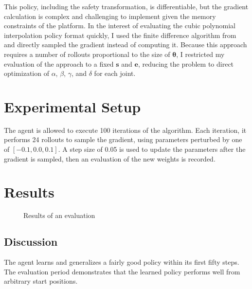 \documentclass{article}
\newcommand{\thetab}{\bm{\theta}}
\begin{document}
This policy, including the safety transformation, is differentiable, but the gradient calculation is complex and challenging to implement given the memory constraints of the platform. In the interest of evaluating the cubic polynomial interpolation policy format quickly, I used the finite difference algorithm from \cite{stone2006} and directly sampled the gradient instead of computing it. Because this approach requires a number of rollouts proportional to the size of $\thetab$,  I restricted my evaluation of the approach to a fixed $\bm{s}$ and $\bm{e}$, reducing the problem to direct optimization of $\alpha$, $\beta$, $\gamma$, and $\delta$ for each joint.
	


\section{Experimental Setup}

The agent is allowed to execute 100 iterations of the algorithm. Each iteration, it performs 24 rollouts to sample the gradient, using parameters perturbed by one of $[-0.1, 0.0, 0.1]$. A step size of 0.05 is used to update the parameters after the gradient is sampled, then an evaluation of the new weights is recorded.



\section{Results}


	\begin{figure}[h]
		\begin{center}
			\caption{Results of an evaluation}
		\end{center}
	\end{figure}
	
\subsection{Discussion}

The agent learns and generalizes a fairly good policy within its first fifty steps. The evaluation period demonstrates that the learned policy performs well from arbitrary start positions. 
\end{document}
